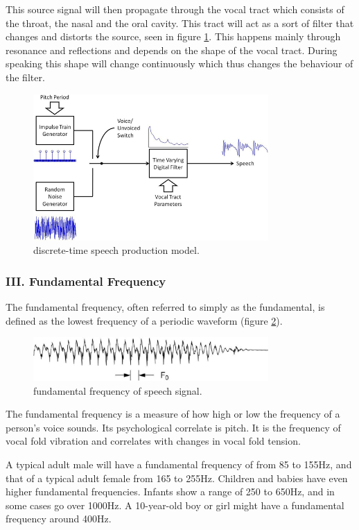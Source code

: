 \documentclass[12pt, a4paper, twoside]{report}
\begin{document}
This source signal will then propagate through the vocal tract which consists of the throat, the nasal and the oral cavity. This tract will act as a sort of filter that changes and distorts the source, seen in figure \ref{fig:discrete-speech-model}. This happens mainly through resonance and reflections and depends on the shape of the vocal tract. During speaking this shape will change continuously which thus changes the behaviour of the filter.

\begin{figure}[ht]
	\centering
	\includegraphics[width=0.8\textwidth]
	{images/chapter2/discrete-speech-model}
	\caption{discrete-time speech production model.}
	\label{fig:discrete-speech-model}
\end{figure}

\subsubsection{III. Fundamental Frequency}
The fundamental frequency, often referred to simply as the fundamental, is defined as the lowest frequency of a periodic waveform (figure \ref{fig:fund-freq-speech}).

\begin{figure}[ht]
	\centering
	\includegraphics[width=0.8\textwidth]
	{images/chapter2/fund-freq-speech}
	\caption{fundamental frequency of speech signal.}
	\label{fig:fund-freq-speech}
\end{figure}

The fundamental frequency is a measure of how high or low the frequency of a person's voice sounds. Its psychological correlate is pitch. It is the frequency of vocal fold vibration and correlates with changes in vocal fold tension.
\par
A typical adult male will have a fundamental frequency of from 85 to 155Hz, and that of a typical adult female from 165 to 255Hz. Children and babies have even higher fundamental frequencies. Infants show a range of 250 to 650Hz, and in some cases go over 1000Hz. A 10-year-old boy or girl might have a fundamental frequency around 400Hz.
\end{document}
